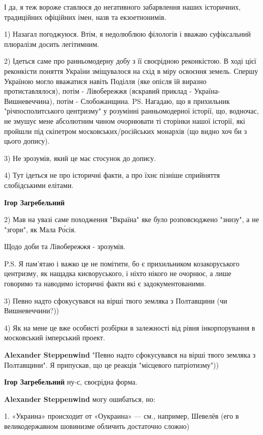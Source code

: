 \begin{itemize}
І да, я теж вороже ставлюся до негативного забарвлення наших історичних,
традиційних офіційних імен, назв та екзоетнонимів.

\begin{itemize} %

1) Назагал погоджуюся. Втім, я недолюблюю філологів і вважаю суфіксальний
плюралізм досить легітимним.

2) Ідеться саме про ранньомодерну добу з її своєрідною реконкістою. В ході цієї
реконкісти поняття України зміщувалося на схід в міру освоєння земель. Спершу
Україною могло вважатися навіть Поділля (яке опісля їй виразно
протиставлялося), потім - Лівобережжя (яскравий приклад -
Україна-Вишневеччина), потім - Слобожанщина. PS. Нагадаю, що я прихильник
"річпосполитського центризму" у розумінні ранньомодерної історії, що, водночас,
не змушує мене абсолютним чином очорнювати ті сторінки нашої історії, які
пройшли під скіпетром московських/російських монархів (що видно хоч би з цього
допису).

3) Не зрозумів, який це має стосунок до допису.

4) Тут ідеться не про історичні факти, а про їхнє пізніше сприйняття
слобідськими елітами.


\textbf{Ігор Загребельний} 

2) Мав на увазі саме походження "Вкраїна" яке було розповсюджено "знизу", а не
"згори", як Мала Ро́сія.

Щодо доби та Лівобережжя - зрозумів.

P.S. Я пам'ятаю і важко це не помітити, бо є прихильником козакоруського
центризму, як нащадка києворуського, і ніхто нікого не очорнює, а лише говоримо
та наводимо історичні факти які є задокументованими.

3) Певно надто сфокусувався на вірші твого земляка з Полтавщини (чи
Вишневеччини?))

4) Як на мене це вже особисті розбірки в залежності від рівня інкорпорування в
московський імперський проект.

\textbf{Alexander Steppenwind} "Певно надто сфокусувався на вірші твого земляка з Полтавщини". Я припускав, що це реакція "місцевого патріотизму"))

\textbf{Ігор Загребельний} ну-с, своєрідна форма.

\textbf{Alexander Steppenwind} могу ошибаться, но:

1. «Украина» происходит от «Оукраина» — см., например, Шевелёв (его в
великодержавном шовинизме обличить достаточно сложно)


\end{itemize}
\end{itemize}
